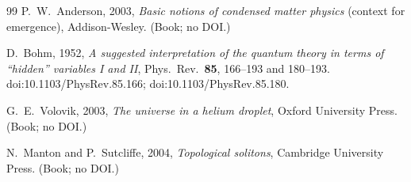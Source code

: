 \documentclass[11pt]{article}
\begin{document}
\begin{thebibliography}{99}
                P.~W.~Anderson, 2003,
                \textit{Basic notions of condensed matter physics} (context for emergence),
                Addison-Wesley. (Book; no DOI.)

                D.~Bohm, 1952,
                \textit{A suggested interpretation of the quantum theory in terms of ``hidden'' variables I and II},
                Phys.\ Rev.\ \textbf{85}, 166--193 and 180--193.
                doi:10.1103/PhysRev.85.166; doi:10.1103/PhysRev.85.180.

                G.~E.~Volovik, 2003,
                \textit{The universe in a helium droplet},
                Oxford University Press. (Book; no DOI.)

                N.~Manton and P.~Sutcliffe, 2004,
                \textit{Topological solitons},
                Cambridge University Press. (Book; no DOI.)

            \end{thebibliography}
\end{document}
